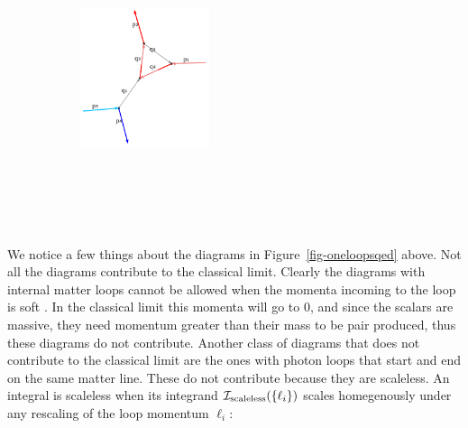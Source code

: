 \documentclass[
  11pt,
  a4paper,
  DIV=11,
  numbers=noendperiod,
  twoside]{scrreprt}
\DeclareRobustCommand{\[}{\begin{equation}}
\DeclareRobustCommand{\]}{\end{equation}}
\begin{document}
\begin{figure}
\begin{minipage}[t]{0.25\linewidth}
{\begin{figure}[H]
{}

\end{figure}

}

\end{minipage}%
\newline
\begin{minipage}[t]{0.25\linewidth}

{\centering 

\begin{figure}[H]

{\centering \includegraphics[width=1.5in,height=3.5in]{./scattering_files/figure-latex/dot-figure-10.png}

}

\end{figure}

}

\end{minipage}%

\end{figure}

We notice a few things about the diagrams in
Figure~\ref{fig-oneloopsqed} above. Not all the diagrams contribute to
the classical limit. Clearly the diagrams with internal matter loops
cannot be allowed when the momenta incoming to the loop is soft
. In the classical limit this momenta
will go to 0, and since the scalars are massive, they need momentum
greater than their mass to be pair produced, thus these diagrams do not
contribute. Another class of diagrams that does not contribute to the
classical limit are the ones with photon loops that start and end on the
same matter line. These do not contribute because they are scaleless. An
integral is scaleless when its integrand
\(\mathcal{I}_\text{scaleless}(\{\ell_i \})\) scales homegenously under
any rescaling of the loop momentum \(\ell_i\):
\end{document}
